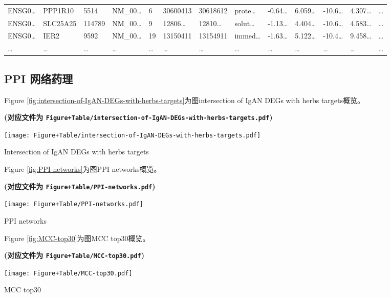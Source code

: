 \documentclass[
]{article}
\begin{document}
\begin{longtable}[]{@{}lllllllllllll@{}}
ENSG0\ldots{} & PPP1R10 & 5514 & NM\_00\ldots{} & 6 & 30600413 & 30618612 & prote\ldots{} & -0.64\ldots{} & 6.059\ldots{} & -10.6\ldots{} & 4.307\ldots{} & \ldots{}\tabularnewline
ENSG0\ldots{} & SLC25A25 & 114789 & NM\_00\ldots{} & 9 & 12806\ldots{} & 12810\ldots{} & solut\ldots{} & -1.13\ldots{} & 4.404\ldots{} & -10.6\ldots{} & 4.583\ldots{} & \ldots{}\tabularnewline
ENSG0\ldots{} & IER2 & 9592 & NM\_00\ldots{} & 19 & 13150411 & 13154911 & immed\ldots{} & -1.63\ldots{} & 5.122\ldots{} & -10.4\ldots{} & 9.458\ldots{} & \ldots{}\tabularnewline
\ldots{} & \ldots{} & \ldots{} & \ldots{} & \ldots{} & \ldots{} & \ldots{} & \ldots{} & \ldots{} & \ldots{} & \ldots{} & \ldots{} & \ldots{}\tabularnewline
\bottomrule
\end{longtable}

\hypertarget{ppi-ux7f51ux7edcux836fux7406}{%
\subsection{PPI 网络药理}\label{ppi-ux7f51ux7edcux836fux7406}}

Figure \ref{fig:intersection-of-IgAN-DEGs-with-herbs-targets}为图intersection of IgAN DEGs with herbs targets概览。

\textbf{(对应文件为 \texttt{Figure+Table/intersection-of-IgAN-DEGs-with-herbs-targets.pdf})}

\def\@captype{figure}
\begin{center}
\texttt{[image: Figure+Table/intersection-of-IgAN-DEGs-with-herbs-targets.pdf]}
\caption{Intersection of IgAN DEGs with herbs targets}\label{fig:intersection-of-IgAN-DEGs-with-herbs-targets}
\end{center}

Figure \ref{fig:PPI-networks}为图PPI networks概览。

\textbf{(对应文件为 \texttt{Figure+Table/PPI-networks.pdf})}

\def\@captype{figure}
\begin{center}
\texttt{[image: Figure+Table/PPI-networks.pdf]}
\caption{PPI networks}\label{fig:PPI-networks}
\end{center}

Figure \ref{fig:MCC-top30}为图MCC top30概览。

\textbf{(对应文件为 \texttt{Figure+Table/MCC-top30.pdf})}

\def\@captype{figure}
\begin{center}
\texttt{[image: Figure+Table/MCC-top30.pdf]}
\caption{MCC top30}\label{fig:MCC-top30}
\end{center}
\end{document}
